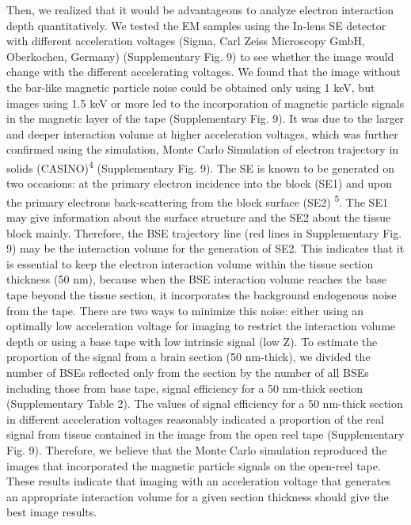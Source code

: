 \documentclass{article}
\begin{document}
Then, we realized that it would be advantageous to analyze electron interaction depth quantitatively. We tested the EM samples using the In-lens SE detector with different acceleration voltages (Sigma, Carl Zeiss Microscopy GmbH, Oberkochen, Germany) (Supplementary Fig. 9) to see whether the image would change with the different accelerating voltages. We found that the image without the bar-like magnetic particle noise could be obtained only using 1 keV, but images using 1.5 keV or more led to the incorporation of magnetic particle signals in the magnetic layer of the tape (Supplementary Fig. 9). It was due to the larger and deeper interaction volume at higher acceleration voltages, which was further confirmed using the simulation, Monte Carlo Simulation of electron trajectory in solids (CASINO)\textsuperscript{4} (Supplementary Fig. 9). The SE is known to be generated on two occasions: at the primary electron incidence into the block (SE1) and upon the primary electrons back-scattering from the block surface (SE2) \textsuperscript{5}. The SE1 may give information about the surface structure and the SE2 about the tissue block mainly. Therefore, the BSE trajectory line (red lines in Supplementary Fig. 9) may be the interaction volume for the generation of SE2. This indicates that it is essential to keep the electron interaction volume within the tissue section thickness (50 nm), because when the BSE interaction volume reaches the base tape beyond the tissue section, it incorporates the background endogenous noise from the tape. There are two ways to minimize this noise: either using an optimally low acceleration voltage for imaging to restrict the interaction volume depth or using a base tape with low intrinsic signal (low Z). To estimate the proportion of the signal from a brain section (50 nm-thick), we divided the number of BSEs reflected only from the section by the number of all BSEs including those from base tape, signal efficiency for a 50 nm-thick section (Supplementary Table 2). The values of signal efficiency for a 50 nm-thick section in different acceleration voltages reasonably indicated a proportion of the real signal from tissue contained in the image from the open reel tape (Supplementary Fig. 9). Therefore, we believe that the Monte Carlo simulation reproduced the images that incorporated the magnetic particle signals on the open-reel tape. These results indicate that imaging with an acceleration voltage that generates an appropriate interaction volume for a given section thickness should give the best image results.
\end{document}
